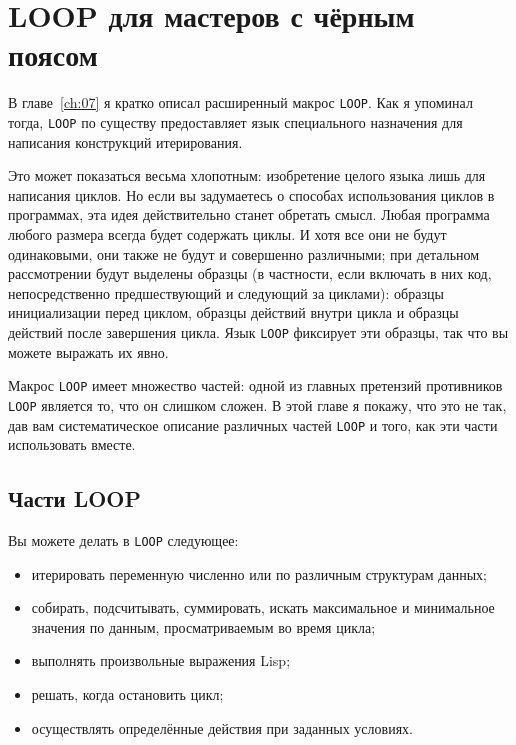 \chapter{LOOP для мастеров с чёрным поясом}
\label{ch:22}

\thispagestyle{empty}

В главе~\ref{ch:07} я кратко описал расширенный макрос \lstinline{LOOP}. Как я упоминал
тогда, \lstinline{LOOP} по существу предоставляет язык специального назначения для написания
конструкций итерирования.

Это может показаться весьма хлопотным: изобретение целого языка лишь для написания
циклов. Но если вы задумаетесь о способах использования циклов в программах, эта идея
действительно станет обретать смысл. Любая программа любого размера всег\-да будет содержать
циклы. И хотя все они не будут одинаковыми, они также не будут и совершенно различными;
при детальном рассмотрении будут выделены образцы (в частности, если включать в них код,
непосредственно предшествующий и следующий за циклами): образцы инициализации перед
циклом, образцы действий внутри цикла и образцы действий после завершения цикла. Язык
\lstinline{LOOP} фиксирует эти образцы, так что вы можете выражать их явно.

Макрос \lstinline{LOOP} имеет множество частей: одной из главных претензий противников
\lstinline{LOOP} является то, что он слишком сложен. В этой главе я покажу, что это не так,
дав вам систематическое описание различных частей \lstinline{LOOP} и того, как эти части
использовать вместе.

\section{Части LOOP}

Вы можете делать в \lstinline{LOOP} следующее:

\begin{itemize}
\item итерировать переменную численно или по различным структурам данных;
\item собирать, подсчитывать, суммировать, искать максимальное и минимальное значения по
  данным, просматриваемым во время цикла;
\item выполнять произвольные выражения Lisp;
\item решать, когда остановить цикл;
\item осуществлять определённые действия при заданных условиях.
\end{itemize}

